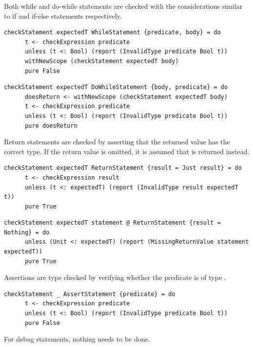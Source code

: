 \documentclass[UdineBachThesis,american,11pt,draft]{PhdThesis}
\begin{document}
  Both while and do-while statements are checked with the considerations similar
  to if and if-else statements respectively.

  \begin{lstlisting}[gobble=4,basicstyle=\ttfamily\small]
    checkStatement expectedT WhileStatement {predicate, body} = do
      t <- checkExpression predicate
      unless (t <: Bool) (report (InvalidType predicate Bool t))
      withNewScope (checkStatement expectedT body)
      pure False
  \end{lstlisting}

  \begin{lstlisting}[gobble=4,basicstyle=\ttfamily\small]
    checkStatement expectedT DoWhileStatement {body, predicate} = do
      doesReturn <- withNewScope (checkStatement expectedT body)
      t <- checkExpression predicate
      unless (t <: Bool) (report (InvalidType predicate Bool t))
      pure doesReturn
  \end{lstlisting}

  Return statements are checked by asserting that the returned value has the
  correct type. If the return value is omitted, it is assumed that
  \lstinline@unit@ is returned instead.

  \begin{lstlisting}[gobble=4,basicstyle=\ttfamily\small]
    checkStatement expectedT ReturnStatement {result = Just result} = do
      t <- checkExpression result
      unless (t <: expectedT) (report (InvalidType result expectedT t))
      pure True
  \end{lstlisting}

  \begin{lstlisting}[gobble=4,basicstyle=\ttfamily\small]
    checkStatement expectedT statement @ ReturnStatement {result = Nothing} = do
      unless (Unit <: expectedT) (report (MissingReturnValue statement expectedT))
      pure True
  \end{lstlisting}

  Assertions are type checked by verifying whether the predicate is of type
  \lstinline@Bool@.

  \begin{lstlisting}[gobble=4,basicstyle=\ttfamily\small]
    checkStatement _ AssertStatement {predicate} = do
      t <- checkExpression predicate
      unless (t <: Bool) (report (InvalidType predicate Bool t))
      pure False
  \end{lstlisting}

  For debug statements, nothing needs to be done.
\end{document}
